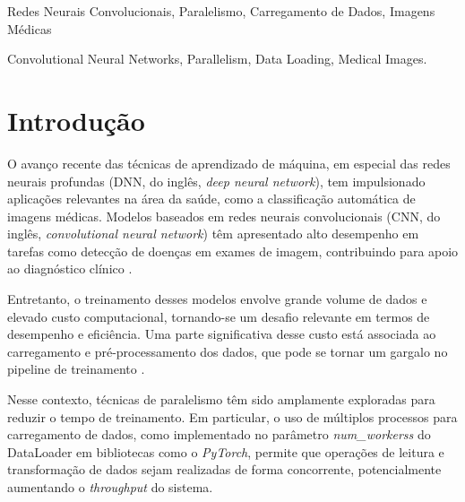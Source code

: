 \documentclass[a4paper,11pt]{article}
\begin{document}
\bigskip
\begin{palchaves}
Redes Neurais Convolucionais, Paralelismo, Carregamento de Dados, Imagens Médicas
\end{palchaves}


\vspace{8mm}

\begin{abstract}
This work analyzes how parallel data loading affects the training of neural networks for medical image classification. It evaluates the impact of num\_workerss and batch\_size on time, throughput, and accuracy, using the HAM10000 dataset on a desktop and on Google Colab. The results show that parallelism can significantly reduce training time by more than 5 times, but there is saturation due to hardware limitations. The batch\_size had a smaller impact. It is concluded that the proper choice of these parameters and the hardware is essential to optimize training.
\end{abstract}

\bigskip
\begin{keywords}
Convolutional Neural Networks, Parallelism, Data Loading, Medical Images.

\end{keywords}

 
\newpage
\section{Introdução} 

O avanço recente das técnicas de aprendizado de máquina, em especial das redes neurais profundas (DNN, do inglês, \textit{deep neural network}), tem impulsionado aplicações relevantes na área da saúde, como a classificação automática de imagens médicas. Modelos baseados em redes neurais convolucionais (CNN, do inglês, \textit{convolutional neural network}) têm apresentado alto desempenho em tarefas como detecção de doenças em exames de imagem, contribuindo para apoio ao diagnóstico clínico \cite{lecun2015deep, krizhevsky2012imagenet}.

Entretanto, o treinamento desses modelos envolve grande volume de dados e elevado custo computacional, tornando-se um desafio relevante em termos de desempenho e eficiência. Uma parte significativa desse custo está associada ao carregamento e pré-processamento dos dados, que pode se tornar um gargalo no pipeline de treinamento \cite{goodfellow2016deep}.

Nesse contexto, técnicas de paralelismo têm sido amplamente exploradas para reduzir o tempo de treinamento. Em particular, o uso de múltiplos processos para carregamento de dados, como implementado no parâmetro \textit{num\_workerss} do DataLoader em bibliotecas como o \textit{PyTorch}, permite que operações de leitura e transformação de dados sejam realizadas de forma concorrente, potencialmente aumentando o \textit{throughput} do sistema.
\end{document}
